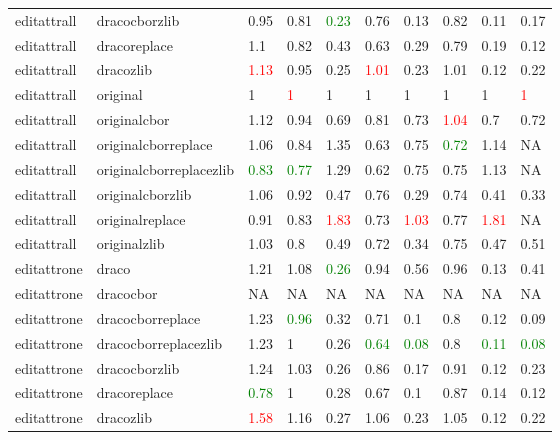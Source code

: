 \begin{landscape}
\begin{longtable}{llllllllll}
\rowcolor{lightgray}  editattrall & dracocborzlib & 0.95 & 0.81 & \textcolor{green}{0.23} & 0.76 & 0.13 & 0.82 & 0.11 & 0.17\\
\rowcolor{lightgray}  editattrall & dracoreplace & 1.1 & 0.82 & 0.43 & 0.63 & 0.29 & 0.79 & 0.19 & 0.12\\
\rowcolor{lightgray}  editattrall & dracozlib & \textcolor{red}{1.13} & 0.95 & 0.25 & \textcolor{red}{1.01} & 0.23 & 1.01 & 0.12 & 0.22\\
\rowcolor{lightgray}  editattrall & original & 1 & \textcolor{red}{1} & 1 & 1 & 1 & 1 & 1 & \textcolor{red}{1}\\
\rowcolor{lightgray}  editattrall & originalcbor & 1.12 & 0.94 & 0.69 & 0.81 & 0.73 & \textcolor{red}{1.04} & 0.7 & 0.72\\
\rowcolor{lightgray}  editattrall & originalcborreplace & 1.06 & 0.84 & 1.35 & 0.63 & 0.75 & \textcolor{green}{0.72} & 1.14 & NA\\
\rowcolor{lightgray}  editattrall & originalcborreplacezlib & \textcolor{green}{0.83} & \textcolor{green}{0.77} & 1.29 & 0.62 & 0.75 & 0.75 & 1.13 & NA\\
editattrall & originalcborzlib & 1.06 & 0.92 & 0.47 & 0.76 & 0.29 & 0.74 & 0.41 & 0.33\\
editattrall & originalreplace & 0.91 & 0.83 & \textcolor{red}{1.83} & 0.73 & \textcolor{red}{1.03} & 0.77 & \textcolor{red}{1.81} & NA\\
editattrall & originalzlib & 1.03 & 0.8 & 0.49 & 0.72 & 0.34 & 0.75 & 0.47 & 0.51\\
editattrone & draco & 1.21 & 1.08 & \textcolor{green}{0.26} & 0.94 & 0.56 & 0.96 & 0.13 & 0.41\\
editattrone & dracocbor & NA & NA & NA & NA & NA & NA & NA & NA\\
editattrone & dracocborreplace & 1.23 & \textcolor{green}{0.96} & 0.32 & 0.71 & 0.1 & 0.8 & 0.12 & 0.09\\
editattrone & dracocborreplacezlib & 1.23 & 1 & 0.26 & \textcolor{green}{0.64} & \textcolor{green}{0.08} & 0.8 & \textcolor{green}{0.11} & \textcolor{green}{0.08}\\
editattrone & dracocborzlib & 1.24 & 1.03 & 0.26 & 0.86 & 0.17 & 0.91 & 0.12 & 0.23\\
editattrone & dracoreplace & \textcolor{green}{0.78} & 1 & 0.28 & 0.67 & 0.1 & 0.87 & 0.14 & 0.12\\
editattrone & dracozlib & \textcolor{red}{1.58} & 1.16 & 0.27 & 1.06 & 0.23 & 1.05 & 0.12 & 0.22\\

\end{longtable}
\end{landscape}
